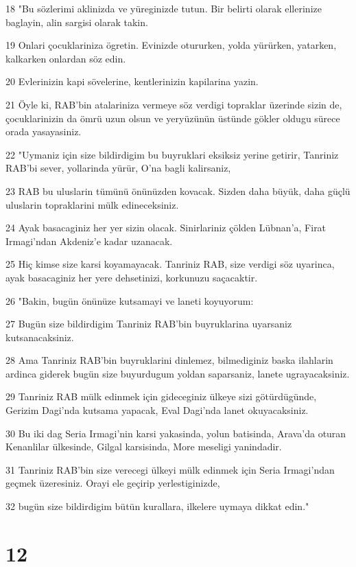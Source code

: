 \par 18 "Bu sözlerimi aklinizda ve yüreginizde tutun. Bir belirti olarak ellerinize baglayin, alin sargisi olarak takin.
\par 19 Onlari çocuklariniza ögretin. Evinizde otururken, yolda yürürken, yatarken, kalkarken onlardan söz edin.
\par 20 Evlerinizin kapi sövelerine, kentlerinizin kapilarina yazin.
\par 21 Öyle ki, RAB'bin atalariniza vermeye söz verdigi topraklar üzerinde sizin de, çocuklarinizin da ömrü uzun olsun ve yeryüzünün üstünde gökler oldugu sürece orada yasayasiniz.
\par 22 "Uymaniz için size bildirdigim bu buyruklari eksiksiz yerine getirir, Tanriniz RAB'bi sever, yollarinda yürür, O'na bagli kalirsaniz,
\par 23 RAB bu uluslarin tümünü önünüzden kovacak. Sizden daha büyük, daha güçlü uluslarin topraklarini mülk edineceksiniz.
\par 24 Ayak basacaginiz her yer sizin olacak. Sinirlariniz çölden Lübnan'a, Firat Irmagi'ndan Akdeniz'e kadar uzanacak.
\par 25 Hiç kimse size karsi koyamayacak. Tanriniz RAB, size verdigi söz uyarinca, ayak basacaginiz her yere dehsetinizi, korkunuzu saçacaktir.
\par 26 "Bakin, bugün önünüze kutsamayi ve laneti koyuyorum:
\par 27 Bugün size bildirdigim Tanriniz RAB'bin buyruklarina uyarsaniz kutsanacaksiniz.
\par 28 Ama Tanriniz RAB'bin buyruklarini dinlemez, bilmediginiz baska ilahlarin ardinca giderek bugün size buyurdugum yoldan saparsaniz, lanete ugrayacaksiniz.
\par 29 Tanriniz RAB mülk edinmek için gideceginiz ülkeye sizi götürdügünde, Gerizim Dagi'nda kutsama yapacak, Eval Dagi'nda lanet okuyacaksiniz.
\par 30 Bu iki dag Seria Irmagi'nin karsi yakasinda, yolun batisinda, Arava'da oturan Kenanlilar ülkesinde, Gilgal karsisinda, More meseligi yanindadir.
\par 31 Tanriniz RAB'bin size verecegi ülkeyi mülk edinmek için Seria Irmagi'ndan geçmek üzeresiniz. Orayi ele geçirip yerlestiginizde,
\par 32 bugün size bildirdigim bütün kurallara, ilkelere uymaya dikkat edin."

\chapter{12}

